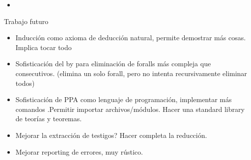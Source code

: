 \begin{itemize}
    \item {}
\end{itemize}

Trabajo futuro

\begin{itemize}
    \item Inducción como axioma de deducción natural, permite demostrar más
    cosas. Implica tocar todo
    \item Sofisticación del by para eliminación de foralls más compleja que
    consecutivos. (elimina un solo forall, pero no intenta recursivamente
    eliminar todos)
    \item Sofisticación de PPA como lenguaje de programación, implementar más
    comandos .Permitir importar archivos/módulos. Hacer una standard library
    de teorías y teoremas. 
    \item Mejorar la extracción de testigos? Hacer completa la reducción.
    \item Mejorar reporting de errores, muy rústico.
\end{itemize}